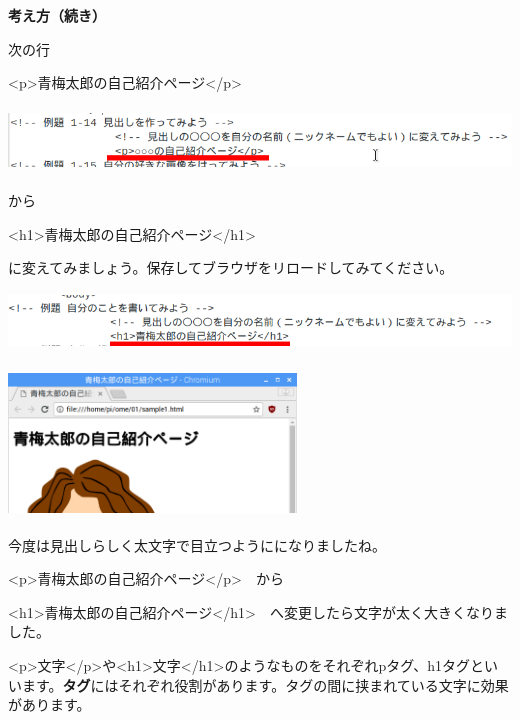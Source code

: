 \documentclass[a4paper,12pt]{jarticle}
\begin{document}
\clearpage
\flushleft
\textbf{考え方（続き）}




次の行

{\textless}p{\textgreater}青梅太郎の自己紹介ページ{\textless}/p{\textgreater}

\bigskip

\includegraphics[width=16.217cm,height=1.739cm]{textbook-img158.png}

から

{\textless}h1{\textgreater}青梅太郎の自己紹介ページ{\textless}/h1{\textgreater}

に変えてみましょう。保存してブラウザをリロードしてみてください。


\bigskip

\includegraphics[width=15.18cm,height=1.528cm]{textbook-img157.png}


\bigskip


\bigskip

\includegraphics[width=7.638cm,height=3.939cm]{textbook-img156.png}


今度は見出しらしく太文字で目立つようにになりましたね。




\bigskip

{\textless}p{\textgreater}青梅太郎の自己紹介ページ{\textless}/p{\textgreater}　から

{\textless}h1{\textgreater}青梅太郎の自己紹介ページ{\textless}/h1{\textgreater}　へ変更したら文字が太く大きくなりました。


\bigskip

{\textless}p{\textgreater}文字{\textless}/p{\textgreater}や{\textless}h1{\textgreater}文字{\textless}/h1{\textgreater}のようなものをそれぞれpタグ、h1タグといいます。\textbf{タグ}にはそれぞれ役割があります。タグの間に挟まれている文字に効果があります。
\end{document}
